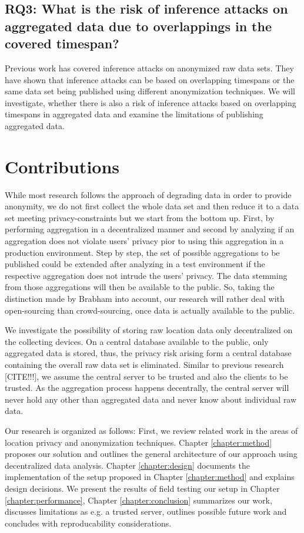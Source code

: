 \subsection*{RQ3: What is the risk of inference attacks on aggregated data due to overlappings in the covered timespan?}
Previous work has covered inference attacks on anonymized raw data sets. They have shown that inference attacks can be based on overlapping timespans or the same data set being published using different anonymization techniques. We will investigate, whether there is also a risk of inference attacks based on overlapping timespans in aggregated data and examine the limitations of publishing aggregated data.

\section{Contributions}
While most research follows the approach of degrading data in order to provide anonymity, we do not first collect the whole data set and then reduce it to a data set meeting privacy-constraints but we start from the bottom up. First, by performing aggregation in a decentralized manner and second by analyzing if an aggregation does not violate users' privacy pior to using this aggregation in a production environment. Step by step, the set of possible aggregations to be published could be extended after analyzing in a test environment if the respective aggregation does not intrude the users' privacy. The data stemming from those aggregations will then be available to the public. So, taking the distinction made by Brabham \parencite{brabham2008crowdsourcing} into account, our research will rather deal with open-sourcing than crowd-sourcing, once data is actually available to the public.

We investigate the possibility of storing raw location data only decentralized on the collecting devices. On a central database available to the public, only aggregated data is stored, thus, the privacy risk arising form a central database containing the overall raw data set is eliminated. Similar to previous research [CITE!!!], we assume the central server to be trusted and also the clients to be trusted. As the aggregation process happens decentrally, the central server will never hold any other than aggregated data and never know about individual raw data. 

Our research is organized as follows: First, we review related work in the areas of location privacy and anonymization techniques.
Chapter \ref{chapter:method} proposes our solution and outlines the general architecture of our approach using decentralized data analysis. Chapter \ref{chapter:design} documents the implementation of the setup proposed in Chapter \ref{chapter:method} and explains design decisions. We present the results of field testing our setup in Chapter \ref{chapter:performance}, Chapter \ref{chapter:conclusion} summarizes our work, discusses limitations as e.g. a trusted server, outlines possible future work and concludes with reproducability considerations.